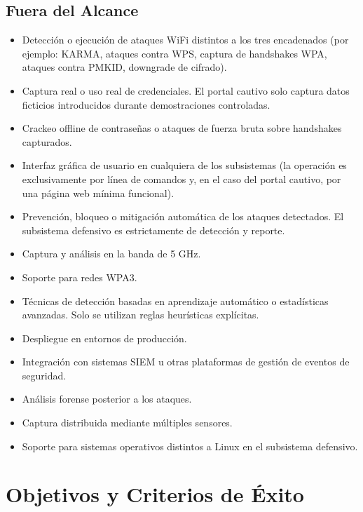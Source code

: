 \documentclass[11pt,a4paper]{article}
\begin{document}
\subsection{Fuera del Alcance}
\begin{itemize}
  \item Detección o ejecución de ataques WiFi distintos a los tres
    encadenados (por ejemplo: KARMA, ataques contra WPS, captura de
    handshakes WPA, ataques contra PMKID, downgrade de cifrado).
  \item Captura real o uso real de credenciales. El portal cautivo solo
    captura datos ficticios introducidos durante demostraciones controladas.
  \item Crackeo offline de contraseñas o ataques de fuerza bruta sobre
    handshakes capturados.
  \item Interfaz gráfica de usuario en cualquiera de los subsistemas (la
    operación es exclusivamente por línea de comandos y, en el caso del
    portal cautivo, por una página web mínima funcional).
  \item Prevención, bloqueo o mitigación automática de los ataques
    detectados. El subsistema defensivo es estrictamente de detección y
    reporte.
  \item Captura y análisis en la banda de 5 GHz.
  \item Soporte para redes WPA3.
  \item Técnicas de detección basadas en aprendizaje automático o
    estadísticas avanzadas. Solo se utilizan reglas heurísticas explícitas.
  \item Despliegue en entornos de producción.
  \item Integración con sistemas SIEM u otras plataformas de gestión de
    eventos de seguridad.
  \item Análisis forense posterior a los ataques.
  \item Captura distribuida mediante múltiples sensores.
  \item Soporte para sistemas operativos distintos a Linux en el subsistema
    defensivo.
\end{itemize}

\section{Objetivos y Criterios de Éxito}
\end{document}

